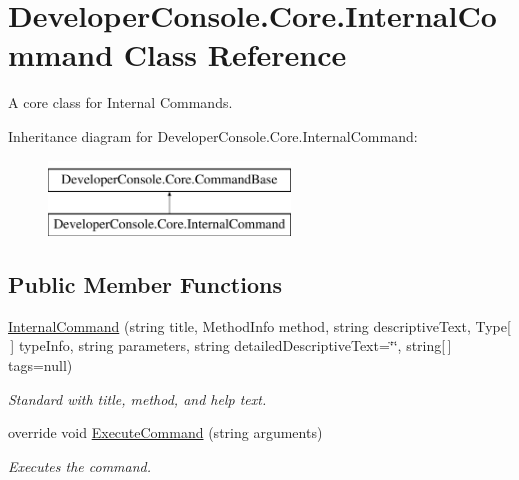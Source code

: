 \hypertarget{class_developer_console_1_1_core_1_1_internal_command}{}\section{Developer\+Console.\+Core.\+Internal\+Command Class Reference}
\label{class_developer_console_1_1_core_1_1_internal_command}


A core class for Internal Commands.  


Inheritance diagram for Developer\+Console.\+Core.\+Internal\+Command\+:\begin{figure}[H]
\begin{center}
\leavevmode
\includegraphics[height=2.000000cm]{class_developer_console_1_1_core_1_1_internal_command}
\end{center}
\end{figure}
\subsection*{Public Member Functions}
\begin{DoxyCompactItemize}
\item 
\hyperlink{class_developer_console_1_1_core_1_1_internal_command_aa2cc5051f7a6ed4b3b8a0b7bcdcd172f}{Internal\+Command} (string title, Method\+Info method, string descriptive\+Text, Type\mbox{[}$\,$\mbox{]} type\+Info, string parameters, string detailed\+Descriptive\+Text=\char`\"{}\char`\"{}, string\mbox{[}$\,$\mbox{]} tags=null)
\begin{DoxyCompactList}\small\item\em Standard with title, method, and help text. \end{DoxyCompactList}\item 
override void \hyperlink{class_developer_console_1_1_core_1_1_internal_command_a1099028980b225c379bae7b3eab35d20}{Execute\+Command} (string arguments)
\begin{DoxyCompactList}\small\item\em Executes the command. \end{DoxyCompactList}\end{DoxyCompactItemize}
